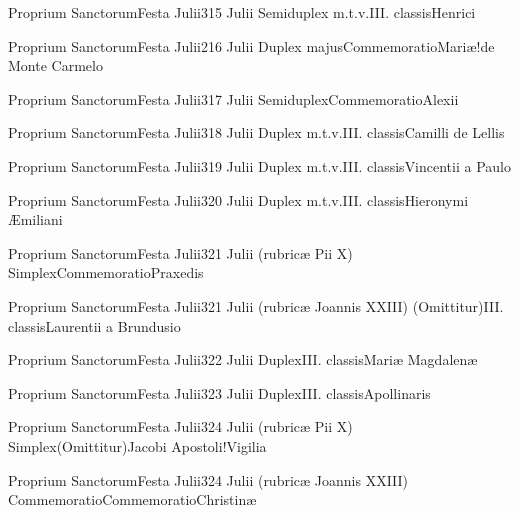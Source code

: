 \documentclass[psalterium-feriale.tex]{subfiles}
\begin{document}
	{Proprium Sanctorum}{Festa Julii}{3}{15 Julii}
	{Semiduplex m.t.v.}{III. classis}{Henrici}
	{}
	{}
\COPOaRubric

	{Proprium Sanctorum}{Festa Julii}{2}{16 Julii}
	{Duplex majus}{Commemoratio}{Mariæ!de Monte Carmelo}
	{}
	{}
\psalmodiapropria

	{Proprium Sanctorum}{Festa Julii}{3}{17 Julii}
	{Semiduplex}{Commemoratio}{Alexii}
	{}
	{}
\COPOaRubric

	{Proprium Sanctorum}{Festa Julii}{3}{18 Julii}
	{Duplex m.t.v.}{III. classis}{Camilli de Lellis}
	{}
	{}
\COPObRubric

	{Proprium Sanctorum}{Festa Julii}{3}{19 Julii}
	{Duplex m.t.v.}{III. classis}{Vincentii a Paulo}
	{}
	{}
\COPObRubric

	{Proprium Sanctorum}{Festa Julii}{3}{20 Julii}
	{Duplex m.t.v.}{III. classis}{Hieronymi Æmiliani}
	{}
	{}
\COPObRubric

	{Proprium Sanctorum}{Festa Julii}{3}{21 Julii (rubricæ Pii X)}
	{Simplex}{Commemoratio}{Praxedis}
	{}
	{}
\MUVNaRubric

	{Proprium Sanctorum}{Festa Julii}{3}{21 Julii (rubricæ Joannis XXIII)}
	{(Omittitur)}{III. classis}{Laurentii a Brundusio}
	{}
	{}
\COPOaRubric

	{Proprium Sanctorum}{Festa Julii}{3}{22 Julii}
	{Duplex}{III. classis}{Mariæ Magdalenæ}
	{}
	{}

	{Proprium Sanctorum}{Festa Julii}{3}{23 Julii}
	{Duplex}{III. classis}{Apollinaris}
	{}
	{}
\UMEXbRubric

	{Proprium Sanctorum}{Festa Julii}{3}{24 Julii (rubricæ Pii X)}
	{Simplex}{(Omittitur)}{Jacobi Apostoli!Vigilia}
	{}
	{}
\feriaRubric

	{Proprium Sanctorum}{Festa Julii}{3}{24 Julii (rubricæ Joannis XXIII)}
	{Commemoratio}{Commemoratio}{Christinæ}
	{}
	{}
\feriaRubric
\end{document}
